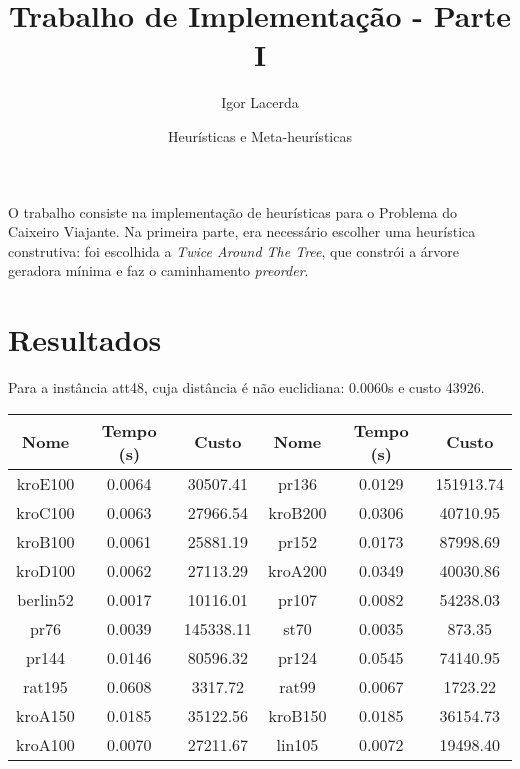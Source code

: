 \documentclass{article}
\author{Igor Lacerda}
\title{Trabalho de Implementação - Parte I}
\date{Heurísticas e Meta-heurísticas}
\begin{document}
\maketitle

O trabalho consiste na implementação de heurísticas para o Problema do Caixeiro Viajante. Na primeira parte, era necessário escolher uma heurística construtiva: foi escolhida a \textit{Twice Around The Tree}, que constrói a árvore geradora mínima e faz o caminhamento \textit{preorder}.

\section*{Resultados}

Para a instância att48, cuja distância é não euclidiana: 0.0060s e custo 43926.

\begin{tabular}{|| c c c | c c c ||}
    \hline
    Nome & Tempo (s) & Custo & Nome & Tempo (s) & Custo \\
    \hline
    kroE100 & 0.0064 & 30507.41 & pr136 & 0.0129 & 151913.74 \\
    kroC100 & 0.0063 & 27966.54 & kroB200 & 0.0306 & 40710.95 \\
    kroB100 & 0.0061 & 25881.19 & pr152 & 0.0173 & 87998.69 \\
    kroD100 & 0.0062 & 27113.29 & kroA200 & 0.0349 & 40030.86 \\
    berlin52 & 0.0017 & 10116.01 & pr107 & 0.0082 & 54238.03 \\
    pr76 & 0.0039 & 145338.11 & st70 & 0.0035 & 873.35 \\
    pr144 & 0.0146 & 80596.32 & pr124 & 0.0545 & 74140.95 \\
    rat195 & 0.0608 & 3317.72 & rat99 & 0.0067 & 1723.22 \\
    kroA150 & 0.0185 & 35122.56 & kroB150 & 0.0185 & 36154.73 \\
    kroA100 & 0.0070 & 27211.67 & lin105 & 0.0072 & 19498.40 \\
    \hline
\end{tabular}
\end{document}
